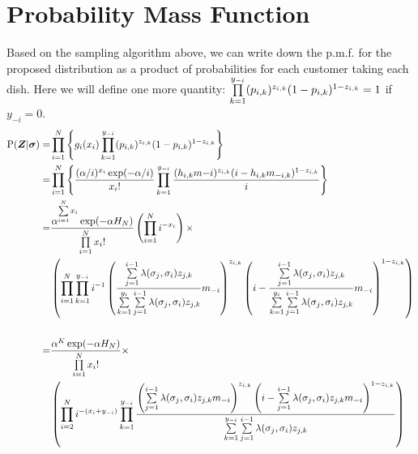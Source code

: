 
\section{Probability Mass Function}
Based on the sampling algorithm above, we can write down the p.m.f. for the
proposed distribution as a product of probabilities for each customer taking
each dish. Here we will define one more quantity:
$\prod\limits_{k=1}^{y_{-i}} (p_{i,k})^{z_{i,k}}(1-p_{i,k})^{1-z_{i,k}}=1$ if $y_{-i}=0$.
\begin{align*}
  \text{P}(\bm Z|\bm\sigma)
  =&\prod\limits_{i=1}^{N} \left\{g_i(x_i) \prod\limits_{k=1}^{y_{-i}} 
    (p_{i,k})^{z_{i,k}}(1-p_{i,k})^{1-z_{i,k}}\right\}\\
  =&\prod\limits_{i=1}^{N} \left\{ \displaystyle\frac{(\alpha/i)^{x_i}\exp(-\alpha/i)}{x_i!} 
    \prod\limits_{k=1}^{y_{-i}} 
    \displaystyle\frac{(h_{i,k}m{-i})^{z_{i,k}}(i-h_{i,k}m_{-i,k})^{1-z_{i,k}}}{i} 
    \right\} \\
  =&\displaystyle\frac{\alpha^{\sum\limits_{i=1}^{N}x_i} \exp(-\alpha H_N)} {\prod\limits_{i=1}^{N}x_i!} 
    \left( \prod\limits_{i=1}^{N}i^{-x_i} \right) \times
    \\
    &\left( \prod\limits_{i=1}^{N}\prod\limits_{k=1}^{y_{-i}} i^{-1}
    \displaystyle\left(\displaystyle\frac{\sum\limits_{j=1}^{i-1}\lambda(\sigma_j,\sigma_i)z_{j,k}} {\sum\limits_{k=1}^{y_i}\sum\limits_{j=1}^{i-1}\lambda(\sigma_j,\sigma_i)z_{j,k}} m_{-i}\right)^{z_{i,k}}
       \left(i-\displaystyle\frac{\sum\limits_{j=1}^{i-1}\lambda(\sigma_j,\sigma_i)z_{j,k}} {\sum\limits_{k=1}^{y_i}\sum\limits_{j=1}^{i-1}\lambda(\sigma_j,\sigma_i)z_{j,k}} m_{-i}\right)^{1-z_{i,k}} \right)\\
   &\\
  =&\displaystyle\frac{\alpha^K \exp(-\alpha H_N)} {\prod\limits_{i=1}^{N}x_i!} \times
    \\
    &\left( \prod\limits_{i=2}^{N} i^{-(x_i+y_{-i})}\prod\limits_{k=1}^{y_{-i}} 
    \displaystyle\frac{
    \left(\sum\limits_{j=1}^{i-1}\lambda(\sigma_j,\sigma_i)z_{j,k}m_{-i}\right)^{z_{i,k}}
    \left(i-\sum\limits_{j=1}^{i-1}
    \lambda(\sigma_j,\sigma_i)z_{j,k}m_{-i}\right)^{1-z_{i,k}}
    }
    {\sum\limits_{k=1}^{y_{-i}}\sum\limits_{j=1}^{i-1}\lambda(\sigma_j,\sigma_i)z_{j,k}}\right)
\end{align*}

